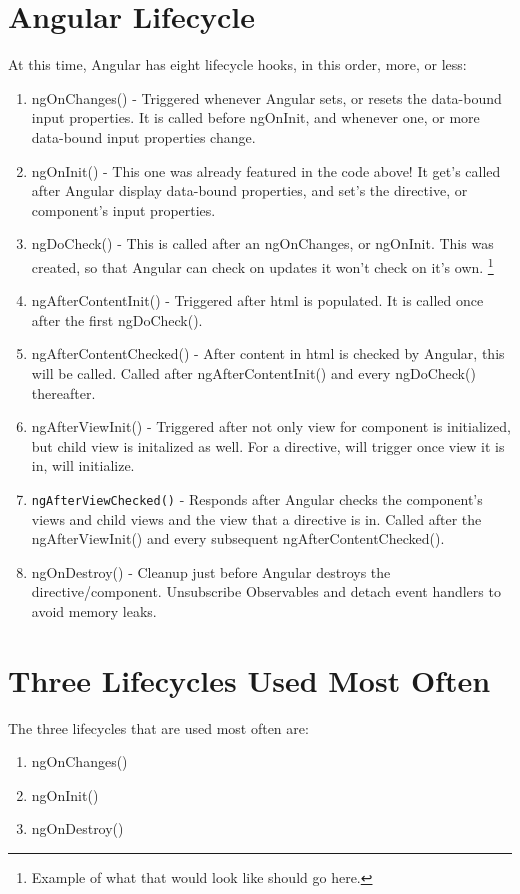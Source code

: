 \section{ Angular Lifecycle }
At this time, Angular has eight lifecycle hooks, in this order, more, or less:
\begin{enumerate}
  \item ngOnChanges() - Triggered whenever Angular sets, or resets the data-bound
  input properties. It is called before ngOnInit, and whenever one, or more
  data-bound input properties change.
  \item ngOnInit() - This one was already featured in the code above! It get's
  called after Angular display data-bound properties, and set's the directive,
  or component's input properties.
  \item ngDoCheck() - This is called after an ngOnChanges, or ngOnInit. This
  was created, so that Angular can check on updates it won't check on it's own.
  \footnote{Example of what that would look like should go here.}
  \item ngAfterContentInit() - Triggered after html is populated. It is called
  once after the first ngDoCheck().
  \item ngAfterContentChecked() - After content in html is checked by Angular,
  this will be called. Called after ngAfterContentInit() and every ngDoCheck()
  thereafter.
  \item ngAfterViewInit() - Triggered after not only view for component is
  initialized, but child view is initalized as well. For a directive, will
  trigger once view it is in, will initialize.
  \item \lstinline{ngAfterViewChecked()} - Responds after Angular checks the component's
  views and child views and the view that a directive is in. Called after the
  ngAfterViewInit() and every subsequent ngAfterContentChecked().
  \item ngOnDestroy() - Cleanup just before Angular destroys the
  directive/component. Unsubscribe Observables and detach event handlers to
  avoid memory leaks.
\end{enumerate}

\section{ Three Lifecycles Used Most Often }
The three lifecycles that are used most often are:
\begin{enumerate}
  \item ngOnChanges()
  \item ngOnInit()
  \item ngOnDestroy()
\end{enumerate}

